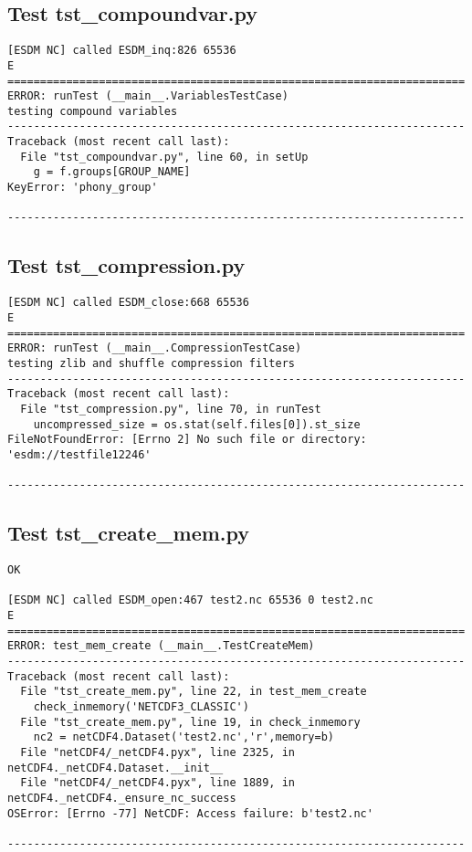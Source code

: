 \subsection{Test tst\_compoundvar.py}

\begin{verbatim}
[ESDM NC] called ESDM_inq:826 65536
E
======================================================================
ERROR: runTest (__main__.VariablesTestCase)
testing compound variables
----------------------------------------------------------------------
Traceback (most recent call last):
  File "tst_compoundvar.py", line 60, in setUp
    g = f.groups[GROUP_NAME]
KeyError: 'phony_group'

----------------------------------------------------------------------
\end{verbatim}

\subsection{Test tst\_compression.py}

\begin{verbatim}
[ESDM NC] called ESDM_close:668 65536
E
======================================================================
ERROR: runTest (__main__.CompressionTestCase)
testing zlib and shuffle compression filters
----------------------------------------------------------------------
Traceback (most recent call last):
  File "tst_compression.py", line 70, in runTest
    uncompressed_size = os.stat(self.files[0]).st_size
FileNotFoundError: [Errno 2] No such file or directory: 'esdm://testfile12246'

----------------------------------------------------------------------
\end{verbatim}

\subsection{Test tst\_create\_mem.py}

\begin{verbatim}
OK

[ESDM NC] called ESDM_open:467 test2.nc 65536 0 test2.nc
E
======================================================================
ERROR: test_mem_create (__main__.TestCreateMem)
----------------------------------------------------------------------
Traceback (most recent call last):
  File "tst_create_mem.py", line 22, in test_mem_create
    check_inmemory('NETCDF3_CLASSIC')
  File "tst_create_mem.py", line 19, in check_inmemory
    nc2 = netCDF4.Dataset('test2.nc','r',memory=b)
  File "netCDF4/_netCDF4.pyx", line 2325, in netCDF4._netCDF4.Dataset.__init__
  File "netCDF4/_netCDF4.pyx", line 1889, in netCDF4._netCDF4._ensure_nc_success
OSError: [Errno -77] NetCDF: Access failure: b'test2.nc'

----------------------------------------------------------------------
\end{verbatim}

